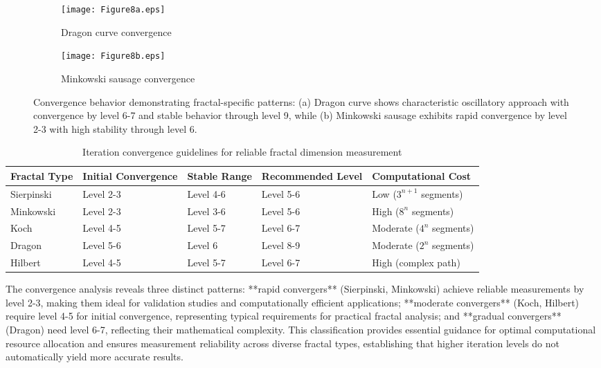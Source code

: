 \documentclass[preprint,12pt]{elsarticle}
\def\textbf#1{#1}%
\begin{document}
\begin{figure}[tbp]
\centering
\begin{subfigure}[b]{0.8\textwidth}
    \centering
    \texttt{[image: Figure8a.eps]}
    \caption{Dragon curve convergence}
    \label{fig:dragon_convergence}
\end{subfigure}

\vspace{0.5cm}

\begin{subfigure}[b]{0.8\textwidth}
    \centering
    \texttt{[image: Figure8b.eps]}
    \caption{Minkowski sausage convergence}
    \label{fig:minkowski_convergence}
\end{subfigure}
\caption{Convergence behavior demonstrating fractal-specific patterns: (a) Dragon curve shows characteristic oscillatory approach with convergence by level 6-7 and stable behavior through level 9, while (b) Minkowski sausage exhibits rapid convergence by level 2-3 with high stability through level 6.}
\label{fig:convergence_examples}
\end{figure}

\begin{table}[H]
\centering
\small
\begin{tabularx}{\textwidth}{@{}lXXXX@{}}
\toprule
\textbf{Fractal Type} & \textbf{Initial Convergence} & \textbf{Stable Range} & \textbf{Recommended Level} & \textbf{Computational Cost} \\
\midrule
Sierpinski & Level 2-3 & Level 4-6 & Level 5-6 & Low ($3^{n+1}$ segments) \\
Minkowski & Level 2-3 & Level 3-6 & Level 5-6 & High ($8^n$ segments) \\
Koch & Level 4-5 & Level 5-7 & Level 6-7 & Moderate ($4^n$ segments) \\
Dragon & Level 5-6 & Level 6 & Level 8-9 & Moderate ($2^n$ segments) \\
Hilbert & Level 4-5 & Level 5-7 & Level 6-7 & High (complex path) \\
\bottomrule
\end{tabularx}
\caption{Iteration convergence guidelines for reliable fractal dimension measurement}
\label{tab:convergence_guidelines}
\end{table}

The convergence analysis reveals three distinct patterns: **rapid convergers** (Sierpinski, Minkowski) achieve reliable measurements by level 2-3, making them ideal for validation studies and computationally efficient applications; **moderate convergers** (Koch, Hilbert) require level 4-5 for initial convergence, representing typical requirements for practical fractal analysis; and **gradual convergers** (Dragon) need level 6-7, reflecting their mathematical complexity. This classification provides essential guidance for optimal computational resource allocation and ensures measurement reliability across diverse fractal types, establishing that higher iteration levels do not automatically yield more accurate results.
\end{document}
